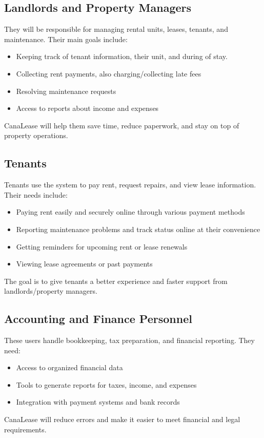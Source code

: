 \documentclass[12pt]{article}
\begin{document}
\subsection{Landlords and Property Managers}
They will be responsible for managing rental units, leases, tenants, and maintenance. Their main goals include:
\begin{itemize}
    \item Keeping track of tenant information, their unit, and during of stay.
    \item Collecting rent payments, also charging/collecting late fees
    \item Resolving maintenance requests
    \item Access to reports about income and expenses
\end{itemize}
CanaLease will help them save time, reduce paperwork, and stay on top of property operations.

\subsection{Tenants}
Tenants use the system to pay rent, request repairs, and view lease information. Their needs include:
\begin{itemize}
    \item Paying rent easily and securely online through various payment methods
    \item Reporting maintenance problems and track status online at their convenience
    \item Getting reminders for upcoming rent or lease renewals
    \item Viewing lease agreements or past payments
\end{itemize}
The goal is to give tenants a better experience and faster support from landlords/property managers.

\subsection{Accounting and Finance Personnel}
These users handle bookkeeping, tax preparation, and financial reporting. They need:
\begin{itemize}
    \item Access to organized financial data
    \item Tools to generate reports for taxes, income, and expenses
    \item Integration with payment systems and bank records
\end{itemize}
CanaLease will reduce errors and make it easier to meet financial and legal requirements.
\end{document}
